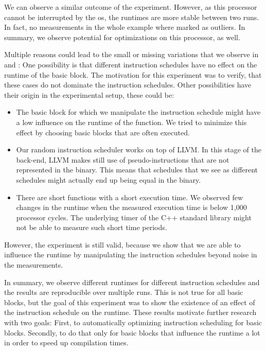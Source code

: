 We can observe a similar outcome of the experiment.
However, as this processor cannot be interrupted by the \ac{os}, the runtimes are more stable between two runs.
In fact, no measurements in the whole example where marked as outliers.
In summary, we observe potential for optimizations on this processor, as well.

Multiple reasons could lead to the small or missing variations that we observe in  and :
One possibility is that different instruction schedules have no effect on the runtime of the basic block.
The motivation for this experiment was to verify, that these cases do not dominate the instruction schedules.
Other possibilities have their origin in the experimental setup, these could be:
\begin{itemize}
    \item The basic block for which we manipulate the instruction schedule might have a low influence on the runtime of the function.
        We tried to minimize this effect by choosing basic blocks that are often executed.
    \item Our random instruction scheduler works on top of LLVM.
        In this stage of the back-end, LLVM makes still use of pseudo-instructions that are not represented in the binary.
        This means that schedules that we see as different schedules might actually end up being equal in the binary.
    \item There are short functions with a short execution time.
        We observed few changes in the runtime when the measured execution time is below 1,000 processor cycles.
        The underlying timer of the C++ standard library might not be able to measure such short time periods.  
\end{itemize}
However, the experiment is still valid, because we show that we are able to influence the runtime by manipulating the instruction schedules beyond noise in the measurements.

In summary, we observe different runtimes for different instruction schedules and the results are reproducible over multiple runs.
This is not true for all basic blocks, but the goal of this experiment was to show the existence of an effect of the instruction schedule on the runtime.
These results motivate further research with two goals:
First, to automatically optimizing instruction scheduling for basic blocks.
Secondly, to do that only for basic blocks that influence the runtime a lot in order to speed up compilation times.

